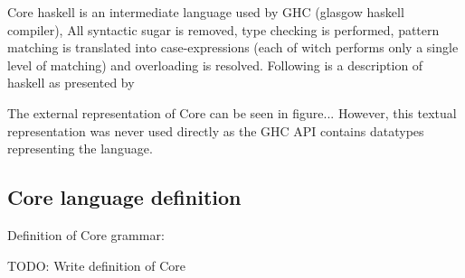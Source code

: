 \documentclass{article}
\begin{document}
Core haskell is an intermediate language used by GHC (glasgow haskell compiler),
All syntactic sugar is removed, type checking is performed, pattern matching is
translated into case-expressions (each of witch performs only a single level of
matching) and overloading is resolved.\cite{jones1992implementing} Following
is a description of haskell as presented by \cite{tolmach2010ghc}

The external representation of Core can be seen in figure... However, this 
textual representation was never used directly as the GHC API contains datatypes 
representing the language.

\subsection{Core language definition}

Definition of Core grammar:

TODO: Write definition of Core
\end{document}
